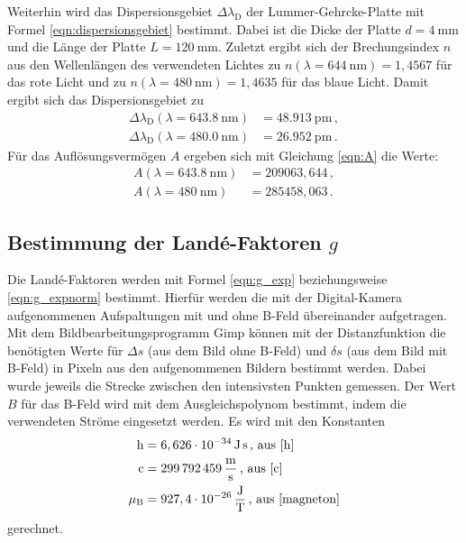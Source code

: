 	Weiterhin wird das Dispersionsgebiet $\Delta \lambda_{\mathrm{D}}$ der
	Lummer-Gehrcke-Platte mit Formel
	\eqref{eqn:dispersionsgebiet} bestimmt. Dabei ist die Dicke der Platte $d=\SI{4}{\milli\meter}$
	und die Länge der Platte  $L = \SI{120}{\milli\meter}$. Zuletzt ergibt sich der
	Brechungsindex $n$ aus den Wellenlängen des verwendeten Lichtes zu
	$n(\lambda=\SI{644}{\nano\meter}) = 1,4567$ für das rote Licht und zu
	$n(\lambda=\SI{480}{\nano\meter}) = 1,4635$ für das blaue Licht. Damit ergibt sich
	das Dispersionsgebiet zu
	\begin{align*}
		\Delta \lambda_{\mathrm{D}}(\lambda=\SI{643.8}{\nano\meter}) &= \SI{48.913}{\pico\meter} \, \mathrm{,} \\
		\Delta \lambda_{\mathrm{D}}(\lambda=\SI{480.0}{\nano\meter}) &= \SI{26.952}{\pico\meter} \, \mathrm{.}
	\end{align*}
	Für das Auflösungsvermögen $A$ ergeben sich mit Gleichung \eqref{eqn:A} die Werte:
\begin{align*}
	A(\lambda=\SI{643.8}{\nano\meter}) &= 209063,644 \, \mathrm{,} \\
	A(\lambda=\SI{480}{\nano\meter}) &= 285458,063 \, \mathrm{.}
\end{align*}

\subsection{Bestimmung der Landé-Faktoren $g$}
	Die Landé-Faktoren werden mit Formel \eqref{eqn:g_exp} beziehungsweise \eqref{eqn:g_expnorm} bestimmt. Hierfür werden die mit der
	Digital-Kamera aufgenommenen Aufspaltungen mit und ohne B-Feld übereinander aufgetragen.
	Mit dem Bildbearbeitungsprogramm Gimp \cite{gimp} können mit der Distanzfunktion
	die benötigten
	Werte für $\Delta s$ (aus dem Bild ohne B-Feld) und $\delta s$ (aus dem Bild mit B-Feld)
	in Pixeln aus den aufgenommenen Bildern bestimmt werden. Dabei wurde jeweils die
	Strecke zwischen den intensivsten Punkten gemessen.
	Der Wert $B$ für das B-Feld wird mit dem Ausgleichspolynom bestimmt, indem die
	verwendeten Ströme eingesetzt werden.
	Es wird mit den Konstanten
	\begin{align*}
		\mathrm{h} &= 6,626 \cdot 10^{-34} \, \si{\joule\second} \, \text{, aus \cite{h}} \\
		\mathrm{c} &= \SI{299792459}{\meter\per\second}\, \text{, aus \cite{c}} \\
		\mu_{\mathrm{B}} &= 927,4 \cdot 10^{-26} \, \si{\joule\per\tesla} \, \text{, aus \cite{magneton}}
	\end{align*}
	gerechnet.
	\FloatBarrier
